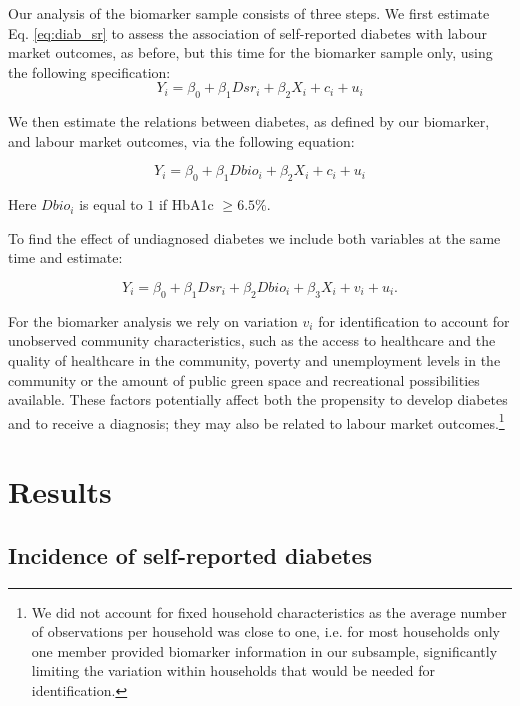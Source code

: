 Our analysis of the biomarker sample consists of three steps. We first estimate Eq. \ref{eq:diab_sr} to assess the association of self-reported diabetes with labour market outcomes, as before, but this time for the biomarker sample only, using the following specification:
\begin{equation}
Y_{i}=\beta_{0}+\beta_{1}Dsr_{i}+\beta_{2}X_{i}+c_{i}+u_{i}\label{eq:diab_sr}
\end{equation}

We then estimate the relations between diabetes, as defined by our biomarker, and labour market outcomes, via the following equation:

\begin{equation}
Y_{i}=\beta_{0}+\beta_{1}Dbio_{i}+\beta_{2}X_{i}+c_{i}+u_{i}\label{eq:diab}
\end{equation}

Here $Dbio_{i}$ is equal to $1$ if \ac{HbA1c} $\geq6.5\%$. 

To find the effect of undiagnosed diabetes we include both variables at the same time and estimate:

\begin{equation}
Y_{i}=\beta_{0}+\beta_{1}Dsr_{i}+\beta_{2}Dbio_{i}+\beta_{3}X_{i}+v_{i}+u_{i}.\label{eq:diab_ud}
\end{equation}

For the biomarker analysis we rely on \DIFdelbegin {}\DIFdelend \DIFaddbegin {}\DIFaddend variation $v_{i}$ for identification to account for unobserved community characteristics, such as the access to healthcare and the quality of healthcare in the community, poverty and unemployment levels in the community or the amount of public green space and recreational possibilities available. These factors potentially affect both the propensity to develop diabetes and to receive a diagnosis; they may also be related to labour market outcomes.\footnote{We did not account for fixed household characteristics as the average number of observations per household was close to one, i.e. for most households only one member provided biomarker information in our subsample, significantly limiting the variation within households that would be needed for identification.}

\section{\label{sec:cha_4_results}Results}


\subsection{Incidence of self-reported diabetes}

